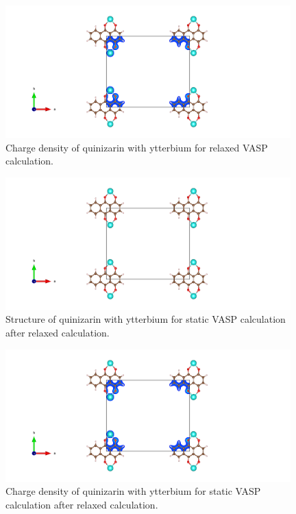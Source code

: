 \documentclass{article}
\begin{document}
  \begin{figure}[H]
      \centering
      \includegraphics[width = 11cm]{../fig/Yb_relax_CHGCAR.png}
      \caption{Charge density of quinizarin with ytterbium for relaxed VASP calculation. }
      \label{fig:Yb_relax_CHGCAR}
  \end{figure}

  \begin{figure}[H]
      \centering
      \includegraphics[width = 11cm]{../fig/Yb_staticafter_CONTCAR.png}
      \caption{Structure of quinizarin with ytterbium for static VASP calculation after relaxed calculation. }
      \label{fig:Yb_staticafter_CONTCAR}
  \end{figure}

  \begin{figure}[H]
      \centering
      \includegraphics[width = 11cm]{../fig/Yb_staticafter_CHGCAR.png}
      \caption{Charge density of quinizarin with ytterbium for static VASP calculation after relaxed calculation. }
      \label{fig:Yb_staticafter_CHGCAR}
  \end{figure}
\end{document}
